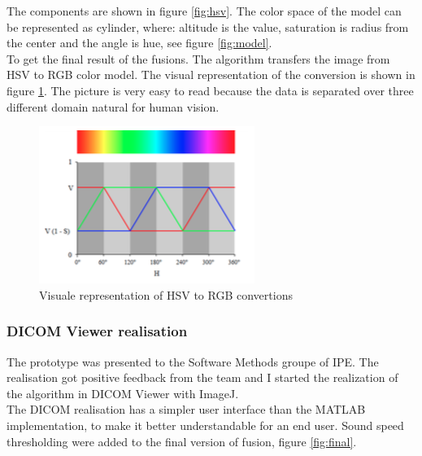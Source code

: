 \documentclass[english]{article}
\begin{document}
The components are shown in figure \ref{fig:hsv}. The color space of the model can be represented as cylinder, where: altitude is the value, saturation is radius from the center and the angle is hue, see figure \ref{fig:model}.\\

To get the final result of the fusions. The algorithm transfers the image from HSV to RGB color model. The visual representation of the conversion is shown in figure \ref{fig:hsv2rgb}. The picture is very easy to read because the data is separated over three different domain natural for human vision.\\

\begin{figure}[H]
\centerline{\includegraphics[scale=0.7]{internship_report/hsv2rgb}}
\caption{Visuale representation of HSV to RGB convertions\label{fig:hsv2rgb}}
\end{figure}

\subsubsection{DICOM Viewer realisation}

The prototype was presented to the Software Methods groupe of IPE. The realisation got positive feedback from the team and I started the realization of the algorithm in DICOM Viewer with ImageJ.\\


The DICOM realisation has a simpler user interface than the MATLAB implementation, to make it better understandable for an end user. Sound speed thresholding were added to the final version of fusion, figure \ref{fig:final}.
\end{document}
